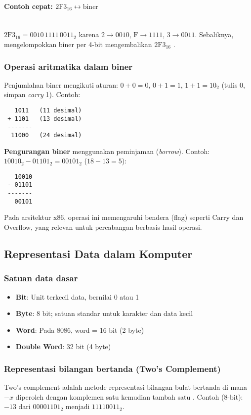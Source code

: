 \paragraph{Contoh cepat: \(\mathrm{2F3}_{16} \leftrightarrow \text{biner}\)}\mbox{}\\
\(\mathrm{2F3}_{16} = 0010\,1111\,0011_2\) karena \(2\to 0010\), \(\mathrm{F}\to 1111\), \(3\to 0011\). Sebaliknya, mengelompokkan biner per 4-bit mengembalikan \(\mathrm{2F3}_{16}\) \cite{wiki_hexadecimal}.

\subsubsection{Operasi aritmatika dalam biner}
Penjumlahan biner mengikuti aturan: \(0+0=0\), \(0+1=1\), \(1+1=10_2\) (tulis 0, simpan \textit{carry} 1). Contoh:
\begin{verbatim}
   1011   (11 desimal)
 + 1101   (13 desimal)
 -------
  11000   (24 desimal)
\end{verbatim}

\textbf{Pengurangan biner} menggunakan peminjaman (\textit{borrow}). Contoh: \(10010_2 - 01101_2 = 00101_2\) (\(18-13=5\)):
\begin{verbatim}
   10010
 - 01101
 -------
   00101
\end{verbatim}
Pada arsitektur x86, operasi ini memengaruhi bendera (flag) seperti Carry dan Overflow, yang relevan untuk percabangan berbasis hasil operasi.

\subsection{Representasi Data dalam Komputer}\label{subsec:pengenalan-representasi-data}

\subsubsection{Satuan data dasar}
\begin{itemize}
    \item \textbf{Bit}: Unit terkecil data, bernilai 0 atau 1
    \item \textbf{Byte}: 8 bit; satuan standar untuk karakter dan data kecil
    \item \textbf{Word}: Pada 8086, word = 16 bit (2 byte)
    \item \textbf{Double Word}: 32 bit (4 byte)
\end{itemize}

\subsubsection{Representasi bilangan bertanda (Two's Complement)}
Two's complement adalah metode representasi bilangan bulat bertanda di mana \(-x\) diperoleh dengan komplemen satu kemudian tambah satu \cite{wiki_two_complement}. Contoh (8-bit): \(-13\) dari \(00001101_2\) menjadi \(11110011_2\).

